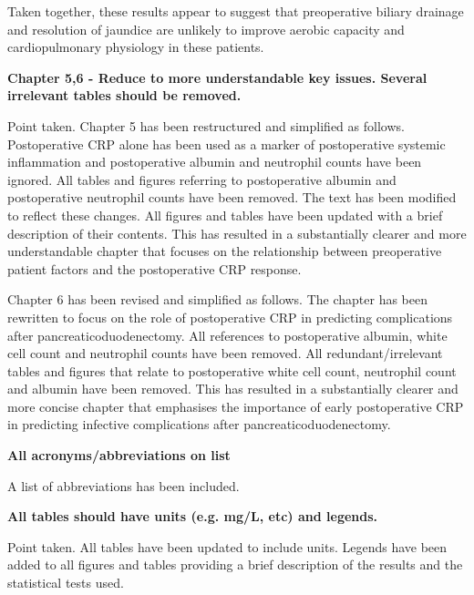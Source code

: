 	Taken together, these results appear to suggest that preoperative biliary drainage and resolution of jaundice are unlikely to improve aerobic capacity and cardiopulmonary physiology in these patients.
	
\textbf{Chapter 5,6 - Reduce to more understandable key issues. Several irrelevant tables should be removed.}

	Point taken. 
	Chapter 5 has been restructured and simplified as follows. 
	Postoperative CRP alone has been used as a marker of postoperative systemic inflammation and postoperative albumin and neutrophil counts have been ignored.
	All tables and figures referring to postoperative albumin and postoperative neutrophil counts have been removed. 
	The text has been modified to reflect these changes. 
	All figures and tables have been updated with a brief description of their contents. 
	This has resulted in a substantially clearer and more understandable chapter that focuses on the relationship between preoperative patient factors and the postoperative CRP response.
	
	Chapter 6 has been revised and simplified as follows.
	The chapter has been rewritten to focus on the role of postoperative CRP in predicting complications after pancreaticoduodenectomy.
	All references to postoperative albumin, white cell count and neutrophil counts have been removed.
	All redundant/irrelevant tables and figures that relate to postoperative white cell count, neutrophil count and albumin have been removed.
	This has resulted in a substantially clearer and more concise chapter that emphasises the importance of early postoperative CRP in predicting infective complications after pancreaticoduodenectomy.
	
\textbf{All acronyms/abbreviations on list}
	
	A list of abbreviations has been included.
	
\textbf{All tables should have units (e.g. mg/L, etc) and legends.}
	
	Point taken. 
	All tables have been updated to include units. 
	Legends have been added to all figures and tables providing a brief description of the results and the statistical tests used.